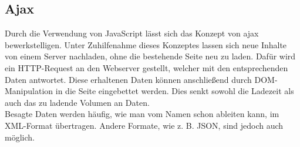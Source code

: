 \subsection{Ajax}
\label{sec:ajax}
Durch die Verwendung von JavaScript lässt sich das Konzept von \ac{ajax} bewerkstelligen. Unter Zuhilfenahme dieses Konzeptes lassen sich neue Inhalte von einem Server nachladen, ohne die bestehende Seite neu zu laden. Dafür wird ein HTTP-Request an den Webserver gestellt, welcher mit den entsprechenden Daten antwortet. Diese erhaltenen Daten können anschließend durch DOM-Manipulation in die Seite eingebettet werden. Dies senkt sowohl die Ladezeit als auch das zu ladende Volumen an Daten. \\
Besagte Daten werden häufig, wie man vom Namen schon ableiten kann, im XML-Format übertragen. Andere Formate, wie z. B. JSON, sind jedoch auch möglich.